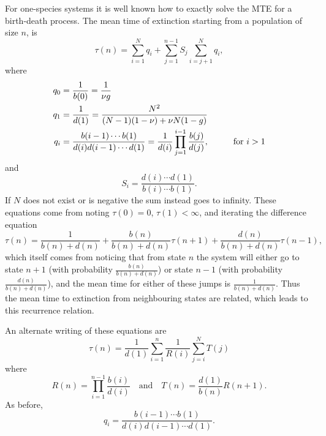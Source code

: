 For one-species systems it is well known how to exactly solve the MTE for a birth-death process. 
The mean time of extinction starting from a population of size $n$, is \cite{Nisbet1982,Palamara2013}
\begin{equation}
\tau(n) = \sum_{i=1}^{N}q_i + \sum_{j=1}^{n-1} S_j\sum_{i=j+1}^{N}q_i,
\end{equation}
where
\begin{align}
q_0 &= \frac{1}{b(0)} = \frac{1}{\nu g} \notag \\
q_1 &= \frac{1}{d(1)} = \frac{N^2}{(N-1)(1-\nu) + \nu N(1-g)} \\
q_i &= \frac{b(i-1)\cdots b(1)}{d(i)d(i-1)\cdots d(1)} = \frac{1}{d(i)}\prod_{j=1}^{i-1}\frac{b(j)}{d(j)}, \hspace{1cm} \text{for }i > 1 \notag
\end{align}
and
\begin{equation}
S_i = \frac{d(i)\cdots d(1)}{b(i)\cdots b(1)}.  
\end{equation}
If $N$ does not exist or is negative the sum instead goes to infinity. 
These equations come from noting $\tau(0)=0$, $\tau(1)<\infty$, and iterating the difference equation \cite{Nisbet1982}
\begin{equation}
\tau(n) = \frac{1}{b(n)+d(n)} 
+ \frac{b(n)}{b(n)+d(n)}\tau(n+1) 
+ \frac{d(n)}{b(n)+d(n)}\tau(n-1),
\end{equation}
which itself comes from noticing that from state $n$ the system will either go to state $n+1$ (with probability $\frac{b(n)}{b(n)+d(n)}$) or state $n-1$ (with probability $\frac{d(n)}{b(n)+d(n)}$), and the mean time for either of these jumps is $\frac{1}{b(n)+d(n)}$. 
Thus the mean time to extinction from neighbouring states are related, which leads to this recurrence relation. 

An alternate writing of these equations are \cite{Palamara2013}
\begin{equation}
\tau(n) = \frac{1}{d(1)} \sum_{i=1}^n \frac{1}{R(i)} \sum_{j=i}^N T(j)
\end{equation}
where
\begin{equation*}
R(n) = \prod_{i=1}^{n-1} \frac{b(i)}{d(i)} \quad \textrm{and} \quad T(n) = \frac{d(1)}{b(n)}R(n+1).
\end{equation*}
As before, 
\begin{equation*}
q_i = \frac{b(i-1)\cdots b(1)}{d(i)d(i-1)\cdots d(1)}. 
\end{equation*}
\fi


